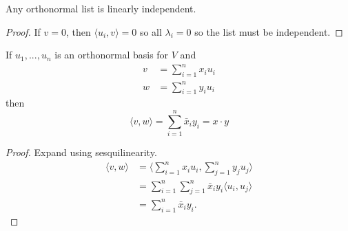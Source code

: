 \begin{lemma}
    Any orthonormal list is linearly independent.
\end{lemma}
\begin{proof}
    If $v = 0$, then $\langle u_i, v \rangle = 0$ so all $\lambda_i = 0$ so the list must be independent.
\end{proof}

\begin{prop}
    If $u_1,...,u_n$ is an orthonormal basis for $V$ and 
    \begin{align*}
      v &= \sum_{ i = 1}^{n} x_i u_i \\
      w &= \sum_{ i = 1}^{n} y_i u_i
    \end{align*}
    then \[\langle v, w \rangle = \sum_{ i = 1}^{n} \bar{x}_i y_i = x \cdot y\]
\end{prop}
\begin{proof}
    Expand using sesquilinearity.
    \begin{align*}
      \langle v, w \rangle &= \langle \sum_{ i = 1}^{n} x_i u_i, \sum_{ j = 1}^{n} y_j u_j \rangle \\
                           &= \sum_{ i = 1}^{n} \sum_{ j = 1}^{n} \bar{x}_i y_i \langle u_i, u_j \rangle \\
                           &= \sum_{ i = 1}^{n} \bar{x}_i y_i
    .\end{align*}
\end{proof}

